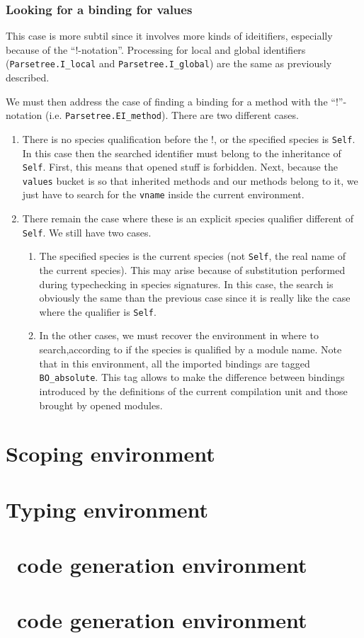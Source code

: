 \subsubsection{Looking for a binding for values}
This case is more subtil since it involves more kinds of ideitifiers,
especially because of the ``!-notation''. Processing for local and
global identifiers ({\tt Parsetree.I\_local} and {\tt Parsetree.I\_global})
are the same as previously described.

We must then address the case of finding a binding for a method with
the ``!''-notation (i.e. {\tt Parsetree.EI\_method}). There are two
different cases.
\begin{enumerate}
\item There is no species qualification before the !, or the specified
  species is {\tt Self}. In this case then the searched identifier
  must belong to the inheritance of {\tt Self}. First, this means that
  opened stuff is forbidden. Next, because the {\tt values} bucket is so
  that inherited methods and our methods belong to it, we just have to
  search for the {\tt vname} inside the current environment.
\item There remain the case where these is an explicit species
  qualifier different of {\tt Self}. We still have two cases.
  \begin{enumerate}
  \item The specified species is the current species (not {\tt Self},
    the real name of the current species). This may arise because of
    substitution performed during typechecking in species
    signatures. In this case, the search is obviously the same than
    the previous case since it is really like the case where the
    qualifier is {\tt Self}.
  \item In the other cases, we must recover the environment in where
    to search,according to if the species is qualified by a module
    name. Note that in this environment, all the imported bindings are
    tagged {\tt BO_absolute}. This tag allows to make the difference
    between bindings introduced by the definitions of the current
    compilation unit and those brought by opened modules.
  \end{enumerate}
\end{enumerate}


\section{Scoping environment}

\section{Typing environment}

\section{\ocaml\ code generation environment}

\section{\coq\ code generation environment}
